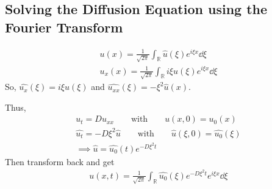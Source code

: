 \documentclass{article}
\newcommand{\Rl}{\mathbb{R}}
\begin{document}
        \subsection{Solving the Diffusion Equation using the Fourier Transform}

            \begin{align}
                u(x) = \frac{1}{\sqrt{2\pi}}\int_\Rl\hat{u}(\xi)e^{i\xi x}\dd \xi \\
                u_x(x) = \frac{1}{\sqrt{2\pi}}\int_\Rl i\xi\hat{u}(\xi)e^{i\xi x}\dd \xi
            \end{align}
            So, $\widehat{u_x}(\xi) = i\xi \hat{u}(\xi)$ and $\widehat{u_{xx}}(\xi) = -\xi^2\hat{u}(x)$.

            Thus,
            \begin{align}
                u_t = Du_{xx} \qquad \text{with} \qquad u(x,0) = u_0(x) \\
                \widehat{u_t} = -D\xi^2\hat{u} \qquad \text{with} \qquad \hat{u}(\xi,0) = \widehat{u_0}(\xi) \\
                \implies \hat{u} = \widehat{u_0}(t)e^{-D\xi^2 t}
            \end{align}
            Then transform back and get
            \begin{align}
                u(x,t) = \frac{1}{\sqrt{2\pi}}\int_\Rl \widehat{u_0}(\xi)e^{-D\xi^2t}e^{i\xi x}\dd \xi
            \end{align}
\end{document}

